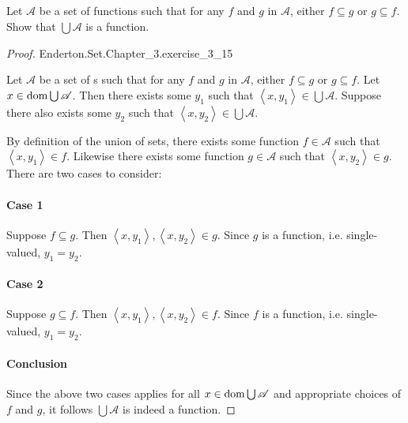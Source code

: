 \documentclass{report}
\newcommand{\pair}[1]{\left< #1 \right>}
\begin{document}
\subsection{}%

Let $\mathscr{A}$ be a set of functions such that for any $f$ and $g$ in
  $\mathscr{A}$, either $f \subseteq g$ or $g \subseteq f$.
Show that $\bigcup{\mathscr{A}}$ is a function.

\begin{proof}

    {Enderton.Set.Chapter\_3.exercise\_3\_15}

  Let $\mathscr{A}$ be a set of s such that for any $f$
    and $g$ in $\mathscr{A}$, either $f \subseteq g$ or $g \subseteq f$.
  Let $x \in \mathop{\text{dom}}{\bigcup{\mathscr{A}}}$.
  Then there exists some $y_1$ such that
    $\pair{x, y_1} \in \bigcup{\mathscr{A}}$.
  Suppose there also exists some $y_2$ such that
    $\pair{x, y_2} \in \bigcup{\mathscr{A}}$.

  By definition of the union of sets, there exists some function
    $f \in \mathscr{A}$ such that $\pair{x, y_1} \in f$.
  Likewise there exists some function $g \in \mathscr{A}$ such that
    $\pair{x, y_2} \in g$.
  There are two cases to consider:

  \paragraph{Case 1}%

    Suppose $f \subseteq g$.
    Then $\pair{x, y_1}, \pair{x, y_2} \in g$.
    Since $g$ is a function, i.e. single-valued, $y_1 = y_2$.

  \paragraph{Case 2}%

    Suppose $g \subseteq f$.
    Then $\pair{x, y_1}, \pair{x, y_2} \in f$.
    Since $f$ is a function, i.e. single-valued, $y_1 = y_2$.

  \paragraph{Conclusion}%

    Since the above two cases applies for all
      $x \in \mathop{\text{dom}}{\bigcup{\mathscr{A}}}$ and appropriate choices of $f$ and $g$,
      it follows $\bigcup{\mathscr{A}}$ is indeed a function.

\end{proof}
\end{document}
